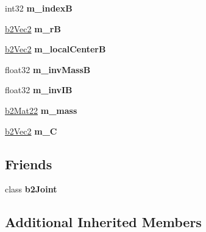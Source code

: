 \begin{DoxyCompactItemize}
\item 
int32 {\bfseries m\+\_\+indexB}\hypertarget{classb2_mouse_joint_a5b2c7802674942419c89f140c7db85b3}{}\label{classb2_mouse_joint_a5b2c7802674942419c89f140c7db85b3}

\item 
\hyperlink{structb2_vec2}{b2\+Vec2} {\bfseries m\+\_\+rB}\hypertarget{classb2_mouse_joint_a00510096c1433e6d7e671cf5bbb1c118}{}\label{classb2_mouse_joint_a00510096c1433e6d7e671cf5bbb1c118}

\item 
\hyperlink{structb2_vec2}{b2\+Vec2} {\bfseries m\+\_\+local\+CenterB}\hypertarget{classb2_mouse_joint_ad9947876df55f4b4e7d435941234e22e}{}\label{classb2_mouse_joint_ad9947876df55f4b4e7d435941234e22e}

\item 
float32 {\bfseries m\+\_\+inv\+MassB}\hypertarget{classb2_mouse_joint_a84c405322a35b0f2649071cdcd7be0fb}{}\label{classb2_mouse_joint_a84c405322a35b0f2649071cdcd7be0fb}

\item 
float32 {\bfseries m\+\_\+inv\+IB}\hypertarget{classb2_mouse_joint_a0a4959ae588d0071d97424e36f15228e}{}\label{classb2_mouse_joint_a0a4959ae588d0071d97424e36f15228e}

\item 
\hyperlink{structb2_mat22}{b2\+Mat22} {\bfseries m\+\_\+mass}\hypertarget{classb2_mouse_joint_a628b7a7a2cd2b50313daea30baf47c4e}{}\label{classb2_mouse_joint_a628b7a7a2cd2b50313daea30baf47c4e}

\item 
\hyperlink{structb2_vec2}{b2\+Vec2} {\bfseries m\+\_\+C}\hypertarget{classb2_mouse_joint_a7ea02e17cdde70717e84bf44614275fb}{}\label{classb2_mouse_joint_a7ea02e17cdde70717e84bf44614275fb}

\end{DoxyCompactItemize}
\subsection*{Friends}
\begin{DoxyCompactItemize}
\item 
class {\bfseries b2\+Joint}\hypertarget{classb2_mouse_joint_a54ade8ed3d794298108d7f4c4e4793fa}{}\label{classb2_mouse_joint_a54ade8ed3d794298108d7f4c4e4793fa}

\end{DoxyCompactItemize}
\subsection*{Additional Inherited Members}


